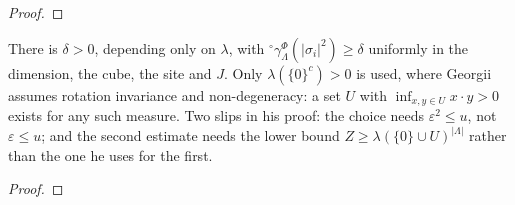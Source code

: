\begin{proof}
    \leanok
\end{proof}

\begin{lemma}[Georgii (20.8)]
    \label{lem:ir-20-8}
    \leanok

    There is $\delta > 0$, depending only on $\lambda$, with ${}^\circ\gamma_\Lambda^\Phi(|\sigma_i|^2)
    \geq \delta$ uniformly in the dimension, the cube, the site and $J$. Only $\lambda(\{0\}^c) > 0$
    is used, where Georgii assumes rotation invariance and non-degeneracy: a set $U$ with
    $\inf_{x,y\in U} x\cdot y > 0$ exists for any such measure. Two slips in his proof: the choice
    needs $\varepsilon^2 \leq u$, not $\varepsilon \leq u$; and the second estimate needs the lower
    bound $Z \geq \lambda(\{0\}\cup U)^{|\Lambda|}$ rather than the one he uses for the first.
\end{lemma}
\begin{proof}
    \leanok
\end{proof}

